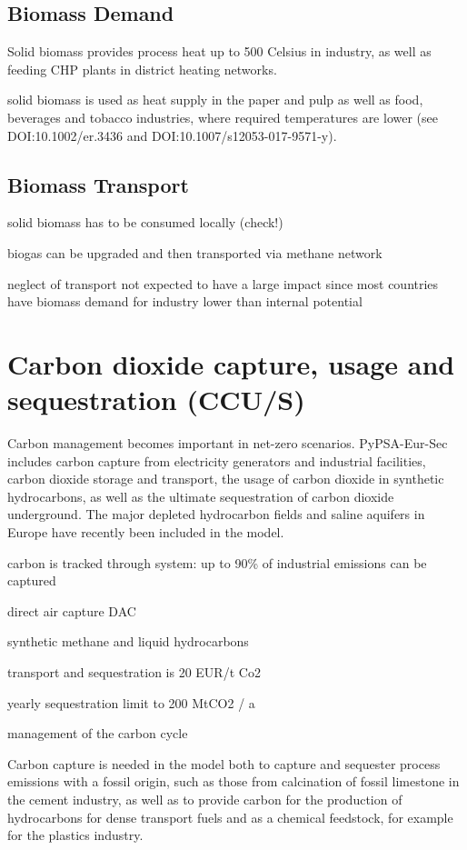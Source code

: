 \subsection{Biomass Demand}

Solid biomass provides process heat up to 500 \deg Celsius in industry, as well as
feeding CHP plants in district heating networks.

solid biomass is used as heat supply in the paper and pulp as well as food, beverages and
tobacco industries, where required temperatures are lower (see
DOI:10.1002/er.3436 and DOI:10.1007/s12053-017-9571-y).

\subsection{Biomass Transport}

solid biomass has to be consumed locally (check!)

biogas can be upgraded and then transported via methane network

neglect of transport not expected to have a large impact since most countries have biomass demand
for industry lower than internal potential


\section{Carbon dioxide capture, usage and sequestration (CCU/S)}

Carbon management becomes important in net-zero scenarios. PyPSA-Eur-Sec
includes carbon capture from electricity generators and industrial facilities,
carbon dioxide storage and transport, the usage of carbon dioxide in synthetic
hydrocarbons, as well as the ultimate sequestration of carbon dioxide
underground. The major depleted hydrocarbon fields and saline aquifers in Europe
have recently been included in the model.

carbon is tracked through system: up to 90\% of industrial emissions can be captured

direct air capture DAC

synthetic methane and liquid hydrocarbons

transport and sequestration is 20 EUR/t Co2

yearly sequestration limit to 200 MtCO2 / a

management of the carbon cycle

Carbon capture is needed in the model both to capture and sequester process
emissions with a fossil origin, such as those from calcination of fossil
limestone in the cement industry, as well as to provide carbon for the
production of hydrocarbons for dense transport fuels and as a chemical
feedstock, for example for the plastics industry.

